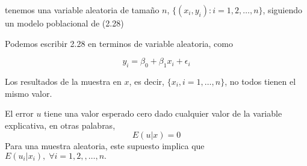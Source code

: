 \begin{tcolorbox}[title={Supuesto 2 SLR.2. Muestro aleatorio},colback = white]
    tenemos una variable aleatoria de tamaño $n$, $\lbrace(x_i,y_i): i = 1,2,\ldots,n\rbrace$, siguiendo un modelo poblacional de (2.28)
\end{tcolorbox}

Podemos escribir 2.28 en terminos de variable aleatoria, como 
\begin{tcolorbox}[colframe=white]
    \begin{equation}
	y_i = \beta_0 + \beta_1 x_i + \epsilon_i
    \end{equation}
\end{tcolorbox}

\begin{tcolorbox}[title={Supuesto 3 SLR.3. Variación aleatoria en la variable explicativa},colback = white]
    Los resultados de la muestra en $x$, es decir, $\lbrace x_i,i=1,\ldots, n\rbrace$, no todos tienen el mismo valor.
\end{tcolorbox}

\begin{tcolorbox}[title={Supuesto 4 SLR.4. Media condicional cero},colback = white]
    El error $u$ tiene una valor esperado cero dado cualquier valor de la variable explicativa, en otras palabras,
    $$E(u|x) = 0$$
    Para una muestra aleatoria, este supuesto implica que $E(u_i|x_i), \; \forall i = 1,2,,\ldots,n.$
\end{tcolorbox}

